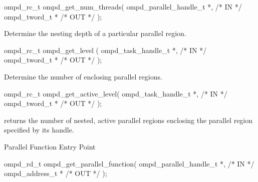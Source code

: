 \format
\ccppspecificstart
\begin{boxedcode}
ompd\_rc\_t ompd\_get\_num\_threads(
  ompd\_parallel\_handle\_t *,                         /* IN */
  ompd\_tword\_t *                                     /* OUT */
);
\end{boxedcode}
\ccppspecificend

\descr

\argdesc

\crossreferences


\summary
Determine the nesting depth of a particular parallel region.

\format
\ccppspecificstart
\begin{boxedcode}
ompd\_rc\_t ompd\_get\_level (
  ompd\_task\_handle\_t *,                                 /* IN */
  ompd\_tword\_t *                                         /* OUT */
); 
\end{boxedcode}
\ccppspecificend

\descr

\argdesc

\crossreferences


\summary
Determine the number of enclosing  parallel regions.

\format
\ccppspecificstart
\begin{boxedcode}
ompd\_rc\_t ompd\_get\_active\_level(
  ompd\_task\_handle\_t *,                                 /* IN */
  ompd\_tword\_t *                                         /* OUT */
); 
\end{boxedcode}
\ccppspecificend

\descr
{} returns the number of nested, active
parallel regions enclosing the parallel region specified by its handle.

\argdesc

\crossreferences


\summary
Parallel Function Entry Point
\format
\ccppspecificstart
\begin{boxedcode}
ompd\_rd\_t ompd\_get\_parallel\_function(
  ompd\_parallel\_handle\_t *,                         /* IN */
  ompd\_address\_t *                             /* OUT */
);
\end{boxedcode}
\ccppspecificend

